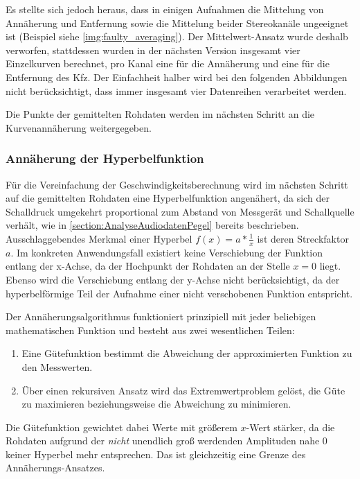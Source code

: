 Es stellte sich jedoch heraus, dass in einigen Aufnahmen die Mittelung von Annäherung und Entfernung sowie die Mittelung beider Stereokanäle ungeeignet ist (Beispiel siehe \autoref{img:faulty_averaging}). Der Mittelwert-Ansatz wurde deshalb verworfen, stattdessen wurden in der nächsten Version insgesamt vier Einzelkurven berechnet, pro Kanal eine für die Annäherung und eine für die Entfernung des Kfz. Der Einfachheit halber wird bei den folgenden Abbildungen nicht berücksichtigt, dass immer insgesamt vier Datenreihen verarbeitet werden.

Die Punkte der gemittelten Rohdaten werden im nächsten Schritt an die Kurvenannäherung weitergegeben.

\FloatBarrier
\subsubsection{Annäherung der Hyperbelfunktion}
Für die Vereinfachung der Geschwindigkeitsberechnung wird im nächsten Schritt auf die gemittelten Rohdaten eine Hyperbelfunktion angenähert, da sich der Schalldruck umgekehrt proportional zum Abstand von Messgerät und Schallquelle verhält, wie in \autoref{section:AnalyseAudiodatenPegel} bereits beschrieben. Ausschlaggebendes Merkmal einer Hyperbel \(f(x) = a * \frac{1}{x}\) ist deren Streckfaktor \(a\). Im konkreten Anwendungsfall existiert keine Verschiebung der Funktion entlang der x-Achse, da der Hochpunkt der Rohdaten an der Stelle \(x = 0\) liegt. Ebenso wird die Verschiebung entlang der y-Achse nicht berücksichtigt, da der hyperbelförmige Teil der Aufnahme einer nicht verschobenen Funktion entspricht.

Der Annäherungsalgorithmus funktioniert prinzipiell mit jeder beliebigen mathematischen Funktion und besteht aus zwei wesentlichen Teilen:
\begin{enumerate}
    \item Eine Gütefunktion bestimmt die Abweichung der approximierten Funktion zu den Messwerten.
    \item Über einen rekursiven Ansatz wird das Extremwertproblem gelöst, die Güte zu maximieren beziehungsweise die Abweichung zu minimieren.
\end{enumerate}

Die Gütefunktion gewichtet dabei Werte mit größerem $x$-Wert stärker, da die Rohdaten aufgrund der \emph{nicht} unendlich groß werdenden Amplituden nahe \(0\) keiner Hyperbel mehr entsprechen. Das ist gleichzeitig eine Grenze des Annäherungs-Ansatzes.

